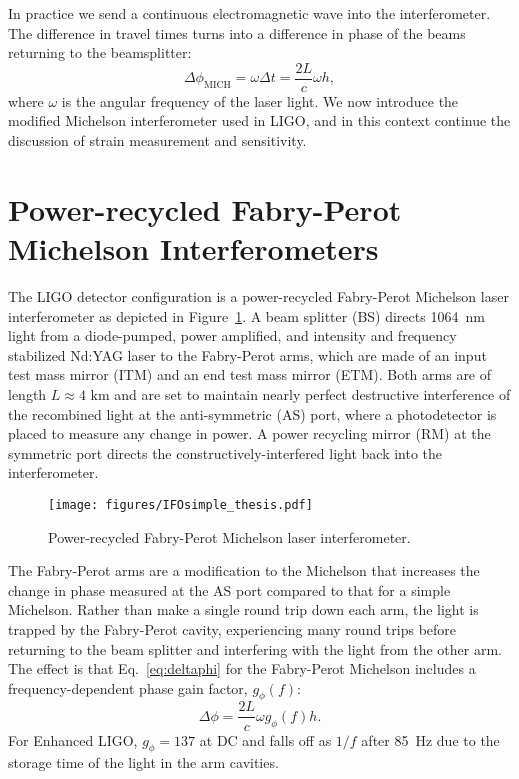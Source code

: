 In practice we send a
continuous electromagnetic wave into the interferometer. The
difference in travel times turns into a difference in phase of
the beams returning to the beamsplitter:
\begin{equation}
\Delta \phi_{\mathrm{MICH}} = \omega \Delta t = \frac{2 L}{c} \omega h,
\label{eq:deltaphi}
\end{equation}
where $\omega$ is the angular frequency of the laser light. We now
introduce the modified Michelson interferometer used in LIGO, and in
this context continue the discussion of strain measurement and
sensitivity.




\section{Power-recycled Fabry-Perot Michelson Interferometers} 
The LIGO detector configuration is a power-recycled Fabry-Perot
Michelson laser interferometer as depicted in
Figure~\ref{fig:IFOschematic}. A beam splitter (BS) directs 1064~nm
light from a diode-pumped, power amplified, and intensity and
frequency stabilized Nd:YAG laser to the Fabry-Perot arms, which
are made of an input test mass mirror (ITM) and an end test mass
mirror (ETM). Both arms are of length $L \approx 4 \text{ km}$ and are
set to maintain nearly perfect destructive interference of the
recombined light at the anti-symmetric (AS) port, where a
photodetector is placed to measure any change in power. A power
recycling mirror (RM) at the symmetric port directs the
constructively-interfered light back into the interferometer.

\begin{figure}
\begin{centering}
\texttt{[image: figures/IFOsimple\_thesis.pdf]}
\caption[Power-recycled Fabry-Perot Michelson laser
interferometer]{Power-recycled Fabry-Perot Michelson laser
  interferometer.}
\label{fig:IFOschematic}
\end{centering}
\end{figure}

The Fabry-Perot arms are a modification to the Michelson that
increases the change in phase measured at the AS port compared to that
for a simple Michelson. Rather than make a single round trip down each
arm, the light is trapped by the Fabry-Perot cavity, experiencing many
round trips before returning to the beam splitter and interfering with
the light from the other arm. The effect is that Eq.~\ref{eq:deltaphi}
for the Fabry-Perot Michelson includes a frequency-dependent phase
gain factor, $g_{\phi}(f)$:
\begin{equation}
\Delta \phi = \frac{2 L}{c} \omega g_{\phi}(f) h.
\label{eq:deltaphi}
\end{equation}
For Enhanced LIGO, $g_{\phi} = 137$ at DC and falls off as $1/f$ after
85~Hz due to the storage time of the light in the arm cavities.

